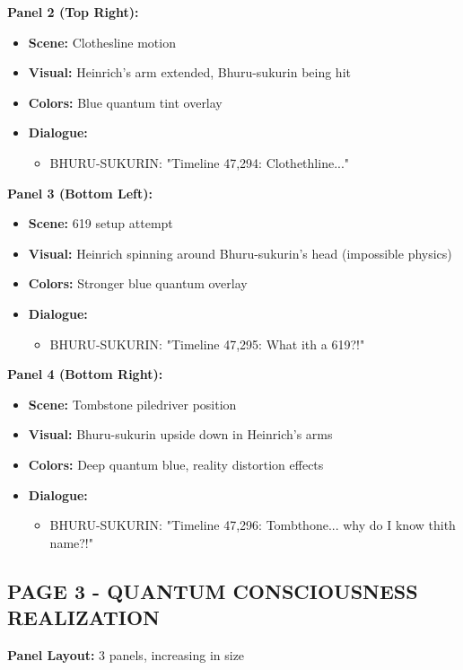 \documentclass[12pt,a4paper]{article}
\begin{document}
\textbf{Panel 2 (Top Right):}
\begin{itemize}
\item \textbf{Scene:} Clothesline motion
\item \textbf{Visual:} Heinrich's arm extended, Bhuru-sukurin being hit
\item \textbf{Colors:} Blue quantum tint overlay
\item \textbf{Dialogue:}
\begin{itemize}
\item BHURU-SUKURIN: "Timeline 47,294: Clothethline..."
\end{itemize}
\end{itemize}

\textbf{Panel 3 (Bottom Left):}
\begin{itemize}
\item \textbf{Scene:} 619 setup attempt
\item \textbf{Visual:} Heinrich spinning around Bhuru-sukurin's head (impossible physics)
\item \textbf{Colors:} Stronger blue quantum overlay
\item \textbf{Dialogue:}
\begin{itemize}
\item BHURU-SUKURIN: "Timeline 47,295: What ith a 619?!"
\end{itemize}
\end{itemize}

\textbf{Panel 4 (Bottom Right):}
\begin{itemize}
\item \textbf{Scene:} Tombstone piledriver position
\item \textbf{Visual:} Bhuru-sukurin upside down in Heinrich's arms
\item \textbf{Colors:} Deep quantum blue, reality distortion effects
\item \textbf{Dialogue:}
\begin{itemize}
\item BHURU-SUKURIN: "Timeline 47,296: Tombthone... why do I know thith name?!"
\end{itemize}
\end{itemize}

\subsection{PAGE 3 - QUANTUM CONSCIOUSNESS REALIZATION}

\textbf{Panel Layout:} 3 panels, increasing in size
\end{document}
